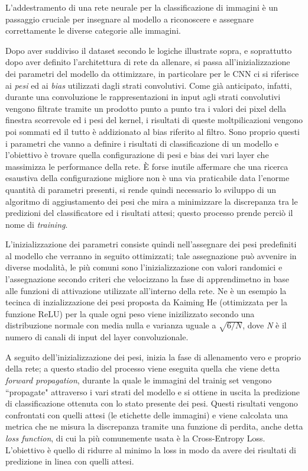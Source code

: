 L'addestramento di una rete neurale per la classificazione di immagini è un passaggio cruciale per insegnare al modello a riconoscere e assegnare correttamente le diverse categorie alle immagini.

Dopo aver suddiviso il dataset secondo le logiche illustrate sopra, e soprattutto dopo aver definito l'architettura di rete da allenare, si passa all'inizializzazione dei parametri del modello da ottimizzare, in particolare per le CNN ci si riferisce ai \textit{pesi} ed ai \textit{bias} utilizzati dagli strati convolutivi. Come già anticipato, infatti, durante una convoluzione le rappresentazioni in input agli strati convolutivi vengono filtrate tramite un prodotto punto a punto tra i valori dei pixel della finestra scorrevole ed i pesi del kernel, i risultati di queste moltpilicazioni vengono poi sommati ed il tutto è addizionato al bias riferito al filtro. Sono proprio questi i parametri che vanno a definire i risultati di classificazione di un modello e l'obiettivo è trovare quella configurazione di pesi e bias dei vari layer che massimizza le performance della rete. È forse inutile affermare che una ricerca esaustiva della configurazione migliore non è una via praticabile data l'enorme quantità di parametri presenti, si rende quindi necessario lo sviluppo di un algoritmo di aggiustamento dei pesi che mira a minimizzare la discrepanza tra le predizioni del classificatore ed i risultati attesi; questo processo prende perciò il nome di \textit{training}.

L'inizializzazione dei parametri consiste quindi nell'assegnare dei pesi predefiniti al modello che verranno in seguito ottimizzati; tale assegnazione può avvenire in diverse modalità, le più comuni sono l'inizializzazione con valori randomici e l'assegnazione secondo criteri che velocizzano la fase di apprendimetno in base alle funzioni di attivazione utilizzate all'interno della rete. Ne è un esempio la tecinca di inzializzazione dei pesi proposta da Kaiming He (ottimizzata per la funzione ReLU) per la quale ogni peso viene inizilizzato secondo una distribuzione normale con media nulla e varianza uguale a $\sqrt{6/N}$, dove \textit{N} è il numero di canali di input del layer convoluzionale.
\cite{1502.01852}

A seguito dell'inizializzazione dei pesi, inizia la fase di allenamento vero e proprio della rete; a questo stadio del processo viene eseguita quella che viene detta \textit{forward propagation}, durante la quale le immagini del trainig set vengono ``propagate" attraverso i vari strati del modello e si ottiene in uscita la predizione di classificazione ottenuta con lo stato presente dei pesi. Questi risultati vengono confrontati con quelli attesi (le etichette delle immagini) e viene calcolata una metrica che ne misura la discrepanza tramite una funzione di perdita, anche detta \textit{loss function}, di cui la più comunemente usata è la Cross-Entropy Loss. L'obiettivo è quello di ridurre al minimo la loss in modo da avere dei risultati di predizione in linea con quelli attesi.

